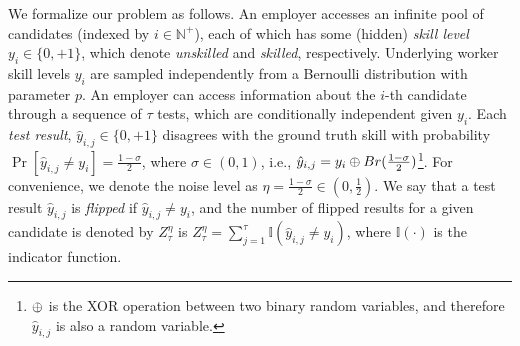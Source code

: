 We formalize our problem as follows. 
An employer accesses an infinite pool of candidates 
(indexed by $i \in \mathbb{N}^+$), 
each of which has some (hidden) \textit{skill level} $y_i\in\{0,+1\}$,
which denote \emph{unskilled} and \emph{skilled}, respectively. 
Underlying worker skill levels $y_i$ are sampled independently
from a Bernoulli distribution with parameter $p$.
An employer can access information about the $i$-th candidate
through a sequence of $\tau$ tests, 
which are conditionally independent given $y_i$. 
Each \textit{test result}, $\hat{y}_{i,j}\in \{0,+1\}$ 
disagrees with the ground truth skill with probability
$\Pr[\hat{y}_{i,j} \neq y_i]=\frac{1-\sigma}{2}$, 
where $\sigma\in(0,1)$, i.e., $\hat{y}_{i,j}=y_i\mathbin{\oplus} Br(\frac{1-\sigma}{2})$\footnote{$\mathbin{\oplus}$ is the XOR operation between two binary random variables, and therefore $\hat{y}_{i,j}$ is also a random variable.}.
For convenience, we denote the noise level as $\eta=\frac{1-\sigma}{2}\in (0,\frac{1}{2})$.
We say that a test result $\hat{y}_{i,j}$ is \textit{flipped} 
if $\hat{y}_{i,j} \ne y_i$, 
and the number of flipped results for a given candidate 
is denoted by 
$Z_\tau^\eta$ is $Z_\tau^\eta=\sum_{j=1}^\tau \mathbb{I}(\hat{y}_{i,j}\ne y_i)$, 
where $\mathbb{I}(\cdot)$ is the indicator function. 


